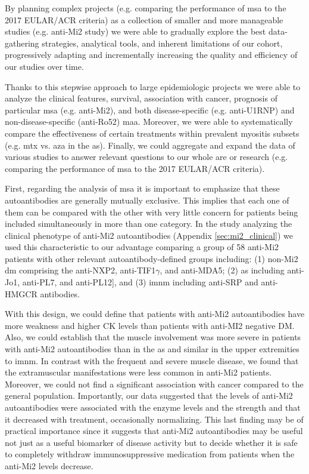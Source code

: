 By planning complex projects (e.g. comparing the performance of \gls{msa} to the 2017 EULAR/ACR criteria) as a collection of smaller and more manageable studies (e.g. anti-Mi2 study) we were able to gradually explore the best data-gathering strategies, analytical tools, and inherent limitations of our cohort, progressively adapting and incrementally increasing the quality and efficiency of our studies over time.

Thanks to this stepwise approach to large epidemiologic projects we were able to analyze the clinical features, survival, association with cancer, prognosis of particular \gls{msa} (e.g. anti-Mi2), and both disease-specific (e.g. anti-U1RNP) and non-disease-specific (anti-Ro52) \gls{maa}. Moreover, we were able to systematically compare the effectiveness of certain treatments within prevalent myositis subsets (e.g. \gls{mtx} vs. \gls{aza} in the \gls{as}). Finally, we could aggregate and expand the data of various studies to answer relevant questions to our whole are or research (e.g. comparing the performance of \gls{msa} to the 2017 EULAR/ACR criteria).

First, regarding the analysis of \gls{msa} it is important to emphasize that these autoantibodies are generally mutually exclusive. This implies that each one of them can be compared with the other with very little concern for patients being included simultaneously in more than one category. In the study analyzing the clinical phenotype of anti-Mi2 autoantibodies (Appendix \autoref{sec:mi2_clinical}) we used this characteristic to our advantage comparing a group of 58 anti-Mi2 patients with other relevant autoantibody-defined groups including: (1) non-Mi2 \gls{dm} comprising the anti-NXP2, anti-TIF1$\gamma$, and anti-MDA5; (2) \gls{as} including anti-Jo1, anti-PL7, and anti-PL12], and (3) \gls{imnm} including anti-SRP and anti-HMGCR antibodies.

With this design, we could define that patients with anti-Mi2 autoantibodies have more weakness and higher CK levels than patients with anti-MI2 negative DM. Also, we could establish that the muscle involvement was more severe in patients with anti-Mi2 autoantibodies than in the \gls{as} and similar in the upper extremities to \gls{imnm}. In contrast with the frequent and severe muscle disease, we found that the extramuscular manifestations were less common in anti-Mi2 patients. Moreover, we could not find a significant association with cancer compared to the general population. Importantly, our data suggested that the levels of anti-Mi2 autoantibodies were associated with the enzyme levels and the strength and that it decreased with treatment, occasionally normalizing. This last finding may be of practical importance since it suggests that anti-Mi2 autoantibodies may be useful not just as a useful biomarker of disease activity but to decide whether it is safe to completely withdraw immunosuppressive medication from patients when the anti-Mi2 levels decrease.


